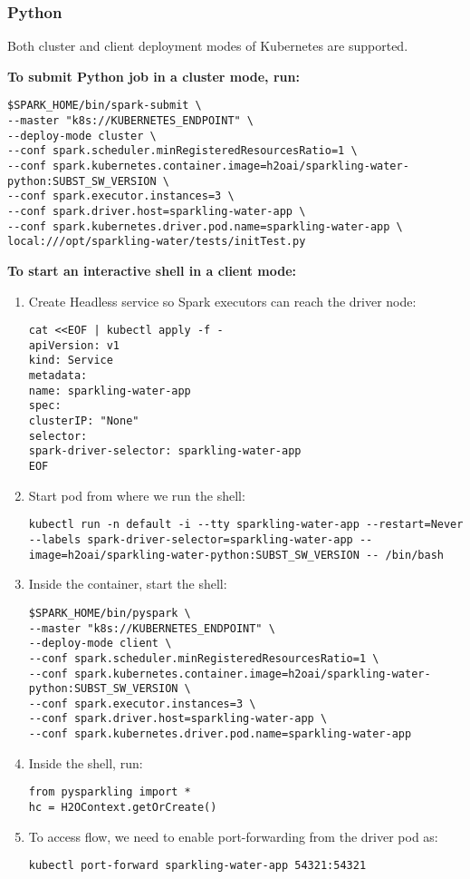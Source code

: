 \subsubsection{Python}

Both cluster and client deployment modes of Kubernetes are supported.

\textbf{To submit Python job in a cluster mode, run:}

\begin{lstlisting}[style=Bash]
$SPARK_HOME/bin/spark-submit \
--master "k8s://KUBERNETES_ENDPOINT" \
--deploy-mode cluster \
--conf spark.scheduler.minRegisteredResourcesRatio=1 \
--conf spark.kubernetes.container.image=h2oai/sparkling-water-python:SUBST_SW_VERSION \
--conf spark.executor.instances=3 \
--conf spark.driver.host=sparkling-water-app \
--conf spark.kubernetes.driver.pod.name=sparkling-water-app \
local:///opt/sparkling-water/tests/initTest.py
\end{lstlisting}

\textbf{To start an interactive shell in a client mode:}

\begin{enumerate}
    \item Create Headless service so Spark executors can reach the driver node:
    \begin{lstlisting}[style=Bash]
cat <<EOF | kubectl apply -f -
apiVersion: v1
kind: Service
metadata:
name: sparkling-water-app
spec:
clusterIP: "None"
selector:
spark-driver-selector: sparkling-water-app
EOF
    \end{lstlisting}
    \item Start pod from where we run the shell:
    \begin{lstlisting}[style=Bash]
kubectl run -n default -i --tty sparkling-water-app --restart=Never --labels spark-driver-selector=sparkling-water-app --image=h2oai/sparkling-water-python:SUBST_SW_VERSION -- /bin/bash
    \end{lstlisting}
    \item Inside the container, start the shell:
    \begin{lstlisting}[style=Bash]
$SPARK_HOME/bin/pyspark \
--master "k8s://KUBERNETES_ENDPOINT" \
--deploy-mode client \
--conf spark.scheduler.minRegisteredResourcesRatio=1 \
--conf spark.kubernetes.container.image=h2oai/sparkling-water-python:SUBST_SW_VERSION \
--conf spark.executor.instances=3 \
--conf spark.driver.host=sparkling-water-app \
--conf spark.kubernetes.driver.pod.name=sparkling-water-app
    \end{lstlisting}
    \item Inside the shell, run:
    \begin{lstlisting}[style=Python]
from pysparkling import *
hc = H2OContext.getOrCreate()
    \end{lstlisting}
    \item To access flow, we need to enable port-forwarding from the driver pod as:
    \begin{lstlisting}[style=Bash]
kubectl port-forward sparkling-water-app 54321:54321
    \end{lstlisting}
\end{enumerate}

